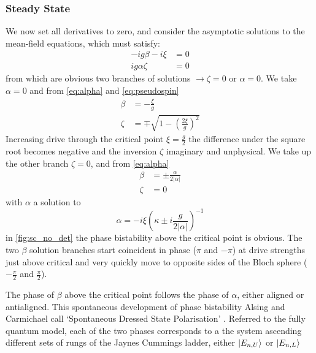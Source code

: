 \subsubsection{Steady State}
We now set all derivatives to zero, and consider the asymptotic solutions to the mean-field equations, which must satisfy:
\begin{align}
  -ig \beta -i \xi &= 0 \\
  ig\alpha \zeta &= 0
\end{align}
from which are obvious two branches of solutions $\rightarrow \zeta = 0$ or $\alpha = 0$. We take $\alpha = 0$ and from \cref{eq:alpha} and \cref{eq:pseudospin}
\begin{align}
  \beta &= -\frac{\xi}{g} \\
  \zeta &= \mp \sqrt{1 - {\left( \frac{2\xi}{g} \right)}^2}
\end{align}
Increasing drive through the critical point $\xi = \frac{g}{2}$ the difference under the square root becomes negative and the inversion $\zeta$ imaginary and unphysical. We take up the other branch $\zeta = 0$, and from \cref{eq:alpha}
\begin{align}
  \beta &= \pm \frac{\alpha}{2|\alpha|} \\
  \zeta &= 0
\end{align}
with $\alpha$ a solution to
\begin{equation}
  \alpha = -i \xi{\left ( \kappa \pm i \frac{g}{2|\alpha|} \right )}^{-1}
  \label{eq:alphacondnotdet}
\end{equation}
in \cref{fig:sc_no_det} the phase bistability above the critical point is obvious. The two $\beta$ solution branches start coincident in phase ($\pi$ and $-\pi$) at drive strengths just above critical and very quickly move to opposite sides of the Bloch sphere ($-\frac{\pi}{2}$ and $\frac{\pi}{2}$).

The phase of $\beta$ above the critical point follows the phase of $\alpha$, either aligned or antialigned. This spontaneous development of phase bistability Alsing and Carmichael call `Spontaneous Dressed State Polarisation' \cite{Alsing1990}. Referred to the fully quantum model, each of the two phases corresponds to a the system ascending different sets of rungs of the Jaynes Cummings ladder, either $\ket{E_{n, U}}$ or $\ket{E_{n, L}}$
